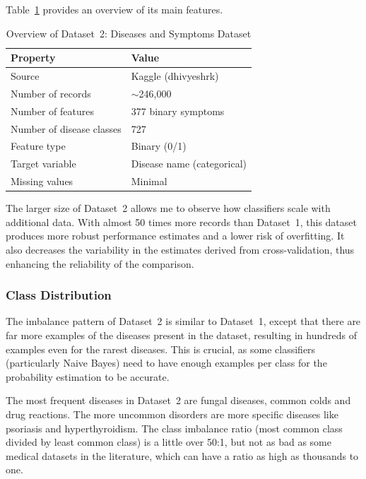Table~\ref{tab:dataset2_overview} provides an overview of its main features.

\begin{table}[H]
\centering
\caption{Overview of Dataset~2: Diseases and Symptoms Dataset}
\label{tab:dataset2_overview}
\begin{tabular}{@{}ll@{}}
\toprule
\textbf{Property}         & \textbf{Value} \\
\midrule
Source                     & Kaggle (dhivyeshrk) \\
Number of records          & $\sim$246,000 \\
Number of features         & 377 binary symptoms \\
Number of disease classes  & 727 \\
Feature type               & Binary (0/1) \\
Target variable            & Disease name (categorical) \\
Missing values             & Minimal \\
\bottomrule
\end{tabular}
\end{table}

The larger size of Dataset~2 allows me to observe how classifiers scale with additional data. With almost 50 times more records than Dataset~1, this dataset produces more robust performance estimates and a lower risk of overfitting. It also decreases the variability in the estimates derived from cross-validation, thus enhancing the reliability of the comparison.

\subsubsection{Class Distribution}

The imbalance pattern of Dataset~2 is similar to Dataset~1, except that there are far more examples of the diseases present in the dataset, resulting in hundreds of examples even for the rarest diseases. This is crucial, as some classifiers (particularly Naive Bayes) need to have enough examples per class for the probability estimation to be accurate.

The most frequent diseases in Dataset~2 are fungal diseases, common colds and drug reactions. The more uncommon disorders are more specific diseases like psoriasis and hyperthyroidism. The class imbalance ratio (most common class divided by least common class) is a little over 50:1, but not as bad as some medical datasets in the literature, which can have a ratio as high as thousands to one.

